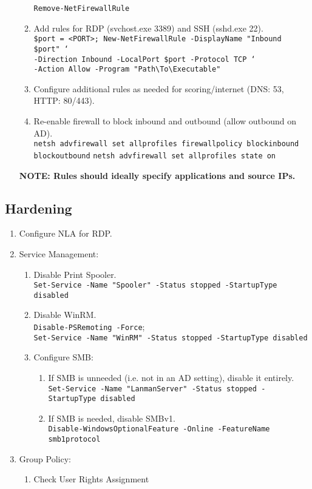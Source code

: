 \documentclass[12pt,letterpaper]{article}
\def\code#1{\textcolor{c2}{\texttt{#1}}}
\def\bf#1{\textbf{#1}}
\begin{document}
\begin{enumerate}
\begin{enumerate}
				\code{Remove-NetFirewallRule}
			\item Add rules for RDP (svchost.exe 3389) and SSH (sshd.exe 22). \\
			\code{\$port = <PORT>; New-NetFirewallRule -DisplayName "Inbound \$port" ` \\
			-Direction Inbound -LocalPort \$port -Protocol TCP ` \\
			-Action Allow -Program "Path\textbackslash{}To\textbackslash{}Executable"}
			\item Configure additional rules as needed for scoring/internet (DNS: 53, HTTP: 80/443).
			\item Re-enable firewall to block inbound and outbound (allow outbound on AD). \\
				\code{netsh advfirewall set allprofiles firewallpolicy blockinbound blockoutbound}
				\code{netsh advfirewall set allprofiles state on}
		\end{enumerate}
	\bf{NOTE: Rules should ideally specify applications and source IPs.}
\end{enumerate}

\pagebreak

\subsection{Hardening}

\begin{enumerate}
	\item Configure NLA for RDP.
	\item Service Management:
	\begin{enumerate}
		\item Disable Print Spooler. \\
			\code{Set-Service -Name "Spooler" -Status stopped -StartupType disabled}
		\item Disable WinRM. \\
			\code{Disable-PSRemoting -Force}; \\
			\code{Set-Service -Name "WinRM" -Status stopped -StartupType disabled}
		\item Configure SMB:
		\begin{enumerate}
			\item If SMB is unneeded (i.e. not in an AD setting), disable it entirely. \\
				\code{Set-Service -Name "LanmanServer" -Status stopped -StartupType disabled}
			\item If SMB is needed, disable SMBv1. \\
				\code{Disable-WindowsOptionalFeature -Online -FeatureName smb1protocol} 
		\end{enumerate}
	\end{enumerate}
	\item Group Policy:
	\begin{enumerate}
		\item Check User Rights Assignment
	\end{enumerate}

\end{enumerate}
\end{document}
